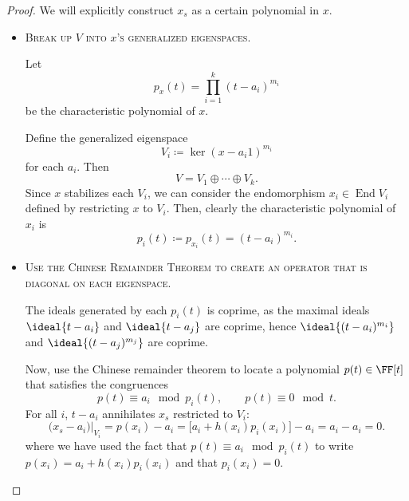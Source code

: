 \documentclass{article}
\DeclarePairedDelimiter\ideal\langle\rangle
\DeclareMathOperator{\End}{End}
\begin{document}
\iffalse
\begin{proof}
    We will explicitly construct $x_s$ as a certain polynomial in $x$.

    \begin{itemize}
        \item[\textbf{Step 1}] 
            \textsc{\color{Crimson} Break up $V$ into $x$'s generalized eigenspaces.}

            Let
            \[
                p_x(t)
                =
                \prod_{i=1}^k
                (t - a_i)^{m_i}
            \]
            be the characteristic polynomial of $x$.

            Define the generalized eigenspace
            \[
                V_i
                \coloneq
                \ker (x - a_i 1)^{m_i}
            \]
            for each $a_i$.
            Then
            \[
                V 
                =
                V_1 \oplus \cdots \oplus V_k.
            \]
            Since $x$ stabilizes each $V_i$, we can consider the endomorphism $x_i \in \End V_i$ defined by restricting $x$ to $V_i$.
            Then, clearly the characteristic polynomial of $x_i$ is
            \[
                p_i(t)
                \coloneq
                p_{x_i}(t)
                =
                (t-a_i)^{m_i}.
            \]
        \item[\textbf{Step 2}] 
            \textsc{\color{Crimson} Use the Chinese Remainder Theorem to create an operator that is diagonal on each eigenspace.}

            The ideals generated by each $p_i(t)$ is coprime, as
            the maximal ideals $\ideal{t-a_i}$ and $\ideal{t-a_j}$ are coprime, hence $\ideal{(t-a_i)^{m_i}}$ and $\ideal{(t-a_j)^{m_j}}$ are coprime.

            Now, use the Chinese remainder theorem to locate a polynomial $p(t) \in \FF[t]$ that satisfies the congruences
            \[
                p(t)
                \equiv
                a_i \mod p_i(t)
                ,\qquad
                p(t)
                \equiv
                0 \mod t.
            \]
            For all $i$, $t - a_i$ annihilates $x_s$ restricted to $V_i$:
            \[
                \big(x_s - a_i\big)\big\rvert_{V_i}
                =
                p(x_i) - a_i
                =
                \big[a_i + h(x_i)p_i(x_i)\big] - a_i
                =
                a_i - a_i
                =
                0.
            \]
            where we have used the fact that $p(t) \equiv a_i \mod p_i(t)$ to write $p(x_i) = a_i + h(x_i)p_i(x_i)$ and that $p_i(x_i) = 0$.


\end{itemize}
\end{proof}
\end{document}
